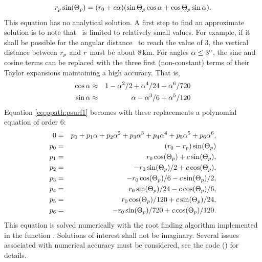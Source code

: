 \begin{equation}
   r_{p} \sin(\Theta_p) = (r_{0}+c\alpha) 
           (\sin\Theta_p \cos\alpha + \cos\Theta_p \sin\alpha).
 \label{eq:ppath:psurf1}
\end{equation}
This equation has no analytical solution. A first step to find an approximate
solution is to note that \Lat\ is limited to relatively small values. For
example, if it shall be possible for the angular distance \Lat\ to reach the
value of 3\degree, the vertical distance between $r_{p}$ and $r$ must be
about 8\,km. For angles $\alpha \leq 3^\circ$, the sine and cosine terms can be
replaced with the three first (non-constant) terms of their Taylor expansions
maintaining a high accuracy. That is,
\begin{eqnarray}
  \cos \alpha & \approx & 1 - \alpha^2 / 2 + \alpha^4 / 24 + \alpha^6 / 720 \nonumber\\
  \sin \alpha & \approx & \alpha - \alpha^3 / 6 + \alpha^5 / 120 \nonumber
\end{eqnarray}
Equation \ref{eq:ppath:psurf1} becomes with these replacements a polynomial
equation of order 6:
\begin{eqnarray}
    0 & = & p_0 + p_1 \alpha + p_2 \alpha^2 + p_3 \alpha^3 + p_4 \alpha^4 + 
                  p_5 \alpha^5 + p_6 \alpha^6, \\
  p_0 & = & (r_{0}-r_{p}) \sin(\Theta_p) \nonumber \\ 
  p_1 & = &   r_{0}\cos(\Theta_p)    + c \sin(\Theta_p), \nonumber \\ 
  p_2 & = & -r_{0}\sin(\Theta_p)/2   + c \cos(\Theta_p),  \nonumber \\ 
  p_3 & = & -r_{0}\cos(\Theta_p)/6   - c \sin(\Theta_p)/2, \nonumber \\ 
  p_4 & = &  r_{0}\sin(\Theta_p)/24  - c \cos(\Theta_p)/6,  \nonumber \\
  p_5 & = &  r_{0}\cos(\Theta_p)/120 + c \sin(\Theta_p)/24,  \nonumber \\
  p_6 & = & -r_{0}\sin(\Theta_p)/720 + c \cos(\Theta_p)/120.  \nonumber 
  \label{eq:ppath:psurf2}
\end{eqnarray}
This equation is solved numerically with the root finding algorithm implemented
in the function . Solutions of interest shall not
be imaginary. Several issues associated with numerical accuracy must be
considered, see the code () for details.

